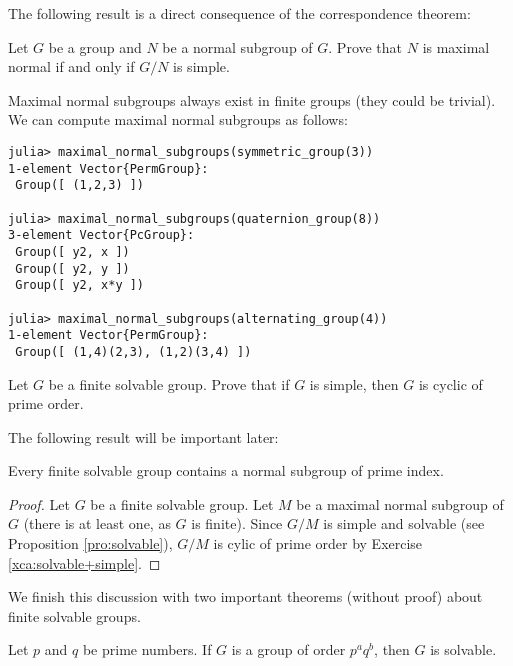 The following result is a direct consequence of the correspondence theorem:

\begin{exercise}
\label{xca:G/N_simple}
    Let $G$ be a group and $N$ be a normal subgroup of $G$. Prove that 
    $N$ is maximal normal if and only if $G/N$ is simple. 
\end{exercise}

Maximal normal subgroups always exist in finite groups (they could be trivial). 
We can compute maximal normal subgroups as follows:
\begin{lstlisting}
julia> maximal_normal_subgroups(symmetric_group(3))
1-element Vector{PermGroup}:
 Group([ (1,2,3) ])

julia> maximal_normal_subgroups(quaternion_group(8))
3-element Vector{PcGroup}:
 Group([ y2, x ])
 Group([ y2, y ])
 Group([ y2, x*y ])

julia> maximal_normal_subgroups(alternating_group(4))
1-element Vector{PermGroup}:
 Group([ (1,4)(2,3), (1,2)(3,4) ])    
\end{lstlisting}


\begin{exercise}
\label{xca:solvable+simple}
    Let $G$ be a finite solvable group. Prove that if $G$ is simple, then 
    $G$ is cyclic of prime order. 
\end{exercise}



The following result will be important later:

\begin{proposition}
    Every finite solvable group contains a normal subgroup of prime index. 
\end{proposition}

\begin{proof}
    Let $G$ be a finite solvable group. 
    Let $M$ be a maximal normal subgroup of $G$ (there is at least one, as $G$ is finite). 
    Since $G/M$ is simple and solvable (see Proposition \ref{pro:solvable}), 
    $G/M$ is cylic of prime order by Exercise \ref{xca:solvable+simple}.  
\end{proof}

We finish this discussion with two important theorems (without proof) 
about finite solvable groups. 

\begin{theorem}[Burnside]
    Let $p$ and $q$ be prime numbers. If $G$ is a group
    of order $p^aq^b$, then $G$ is solvable. 
\end{theorem}

